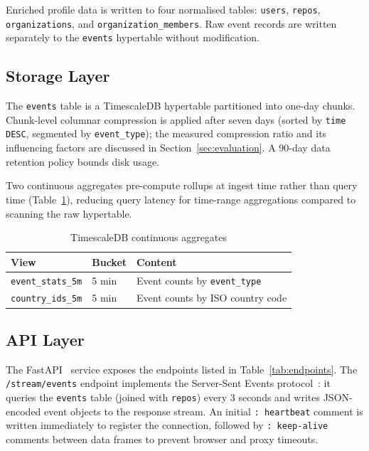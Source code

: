 \documentclass[sigconf]{acmart}
\begin{document}
Enriched profile data is written to four normalised tables:
\texttt{users}, \texttt{repos}, \texttt{organizations}, and
\texttt{organization\_members}. Raw event records are written separately to
the \texttt{events} hypertable without modification.

\subsection{Storage Layer}

The \texttt{events} table is a TimescaleDB hypertable partitioned into
one-day chunks. Chunk-level columnar compression is applied after seven days
(sorted by \texttt{time DESC}, segmented by \texttt{event\_type}); the
measured compression ratio and its influencing factors are discussed in
Section~\ref{sec:evaluation}. A 90-day data retention policy bounds disk usage.

Two continuous aggregates pre-compute rollups at ingest time rather
than query time (Table~\ref{tab:aggregates}), reducing query latency for
time-range aggregations compared to scanning the raw hypertable.

\begin{table}[ht]
  \caption{TimescaleDB continuous aggregates}
  \label{tab:aggregates}
  \begin{tabularx}{\linewidth}{l l X}
    \toprule
    \textbf{View} & \textbf{Bucket} & \textbf{Content} \\
    \midrule
    \texttt{event\_stats\_5m}  & 5 min & Event counts by \texttt{event\_type} \\
    \texttt{country\_ids\_5m}  & 5 min & Event counts by ISO country code \\
    \bottomrule
  \end{tabularx}
\end{table}

\subsection{API Layer}

The FastAPI~\cite{fastapi} service exposes the endpoints listed in
Table~\ref{tab:endpoints}. The \texttt{/stream/events} endpoint implements
the Server-Sent Events protocol~\cite{sse-spec}: it queries the
\texttt{events} table (joined with \texttt{repos}) every 3 seconds
and writes JSON-encoded event objects to the response stream. An initial \texttt{: heartbeat} comment is written immediately to register
the connection, followed by \texttt{: keep-alive} comments between data
frames to prevent browser and proxy timeouts.
\end{document}
